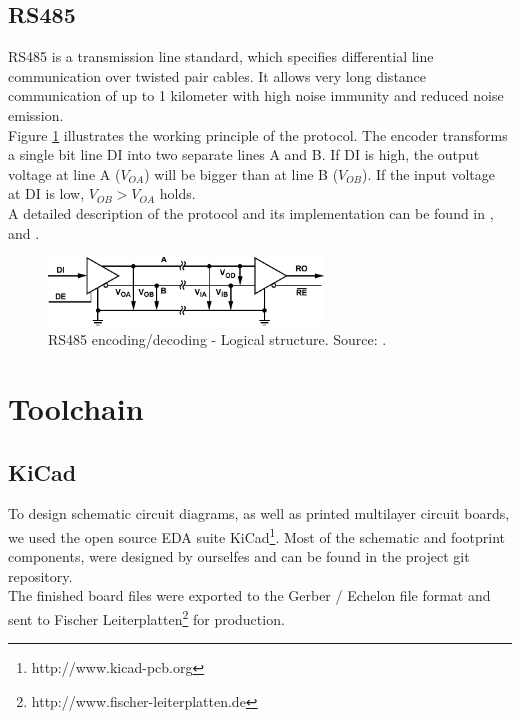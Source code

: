 \documentclass[a4paper]{scrreprt}
\begin{document}
\subsection{RS485}
RS485 is a transmission line standard, which specifies differential line communication over twisted pair cables.
It allows very long distance communication of up to 1 kilometer with high noise immunity and reduced noise emission.\\
Figure \ref{fig:rs485} illustrates the working principle of the protocol.
The encoder transforms a single bit line DI into two separate lines A and B.
If DI is high, the output voltage at line A ($V_{OA}$) will be bigger than at line B ($V_{OB}$).
If the input voltage at DI is low, $V_{OB}>V_{OA}$ holds.\\
A detailed description of the protocol and its implementation can be found in \cite{rs485}, \cite{st485} and \cite{st485appnote}.
\null
\vfill
\begin{figure}[htbp]
	\centering
	\includegraphics[width=0.65\textwidth]{img/rs485.pdf}
  \caption{RS485 encoding/decoding - Logical structure. Source: \cite{rs485}.}
	\label{fig:rs485}
\end{figure}
\section{Toolchain}
\subsection{KiCad}
To design schematic circuit diagrams, as well as printed multilayer circuit boards, we used the open source EDA suite KiCad\footnote{http://www.kicad-pcb.org}. Most of the schematic and footprint components, were designed by ourselfes and can be found in the project git repository.\\
The finished board files were exported to the Gerber / Echelon file format and sent to Fischer Leiterplatten\footnote{http://www.fischer-leiterplatten.de} for production.
\end{document}
